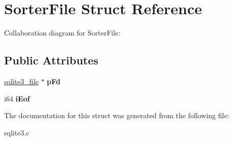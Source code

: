 \hypertarget{structSorterFile}{}\section{Sorter\+File Struct Reference}
\label{structSorterFile}


Collaboration diagram for Sorter\+File\+:
\subsection*{Public Attributes}
\begin{DoxyCompactItemize}
\item 
\hyperlink{structsqlite3__file}{sqlite3\+\_\+file} $\ast$ {\bfseries p\+Fd}\hypertarget{structSorterFile_afa23123282380b8d04b943479cabadef}{}\label{structSorterFile_afa23123282380b8d04b943479cabadef}

\item 
i64 {\bfseries i\+Eof}\hypertarget{structSorterFile_a5c5f37fc8b5c432d8bf30eb6e40f7823}{}\label{structSorterFile_a5c5f37fc8b5c432d8bf30eb6e40f7823}

\end{DoxyCompactItemize}


The documentation for this struct was generated from the following file\+:\begin{DoxyCompactItemize}
\item 
sqlite3.\+c\end{DoxyCompactItemize}
